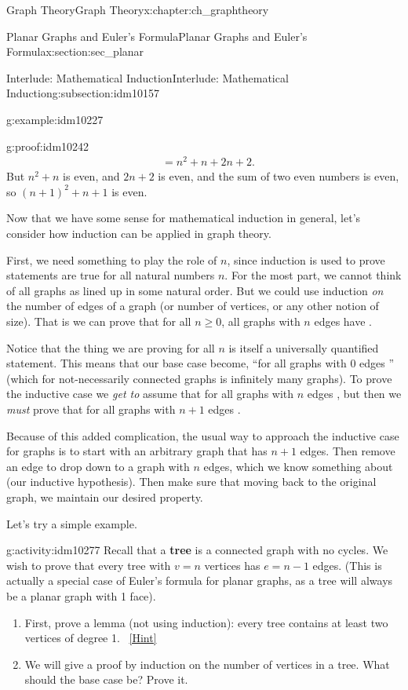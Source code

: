 \documentclass[oneside,10pt,]{book}
\newcommand{\terminology}[1]{\textbf{#1}}
\numberwithin{equation}{chapter}
\newcommand{\amp}{&}
\begin{document}
\begin{chapterptx}{Graph Theory}{}{Graph Theory}{}{}{x:chapter:ch_graphtheory}
\begin{sectionptx}{Planar Graphs and Euler's Formula}{}{Planar Graphs and Euler's Formula}{}{}{x:section:sec_planar}
\begin{subsectionptx}{Interlude: Mathematical Induction}{}{Interlude: Mathematical Induction}{}{}{g:subsection:idm10157}
\begin{example}{}{g:example:idm10227}
\begin{proofptx}{}{g:proof:idm10242}
\begin{align*}
\amp = n^2 + n + 2n + 2.
\end{align*}
But \(n^2 + n\) is even, and \(2n + 2\) is even, and the sum of two even numbers is even, so \((n+1)^2 + n+1\) is even.%
\end{proofptx}
\end{example}
Now that we have some sense for mathematical induction in general, let's consider how induction can be applied in graph theory.%
\par
First, we need something to play the role of \(n\), since induction is used to prove statements are true for all natural numbers \(n\).  For the most part, we cannot think of all graphs as lined up in some natural order.  But we could use induction \emph{on} the number of edges of a graph (or number of vertices, or any other notion of size).  That is we can prove that for all \(n\ge 0\), all graphs with \(n\) edges have \textellipsis{}.%
\par
Notice that the thing we are proving for all \(n\) is itself a universally quantified statement. This means that our base case become, ``for all graphs with 0 edges \textellipsis{}'' (which for not-necessarily connected graphs is infinitely many graphs).  To prove the inductive case we \emph{get to} assume that for all graphs with \(n\) edges \textellipsis{}, but then we \emph{must} prove that for all graphs with \(n+1\) edges \textellipsis{}.%
\par
Because of this added complication, the usual way to approach the inductive case for graphs is to start with an arbitrary graph that has \(n+1\) edges.  Then remove an edge to drop down to a graph with \(n\) edges, which we know something about (our inductive hypothesis).  Then make sure that moving back to the original graph, we maintain our desired property.%
\par
Let's try a simple example.%
\begin{activity}{}{g:activity:idm10277}%
Recall that a \terminology{tree} is a connected graph with no cycles.  We wish to prove that every tree with \(v = n\) vertices has \(e = n-1\) edges.  (This is actually a special case of Euler's formula for planar graphs, as a tree will always be a planar graph with 1 face).%
\begin{enumerate}[font=\bfseries,label=(\alph*),ref=\alph*]
\item{}First, prove a lemma (not using induction): every tree contains at least two vertices of degree 1.%
\qquad~\hfill{\tiny\hyperlink{g:hint:idm10286-back}{[Hint]}}\item{}We will give a proof by induction on the number of vertices in a tree.  What should the base case be?  Prove it.%

\end{enumerate}
\end{activity}
\end{subsectionptx}
\end{sectionptx}
\end{chapterptx}
\end{document}
